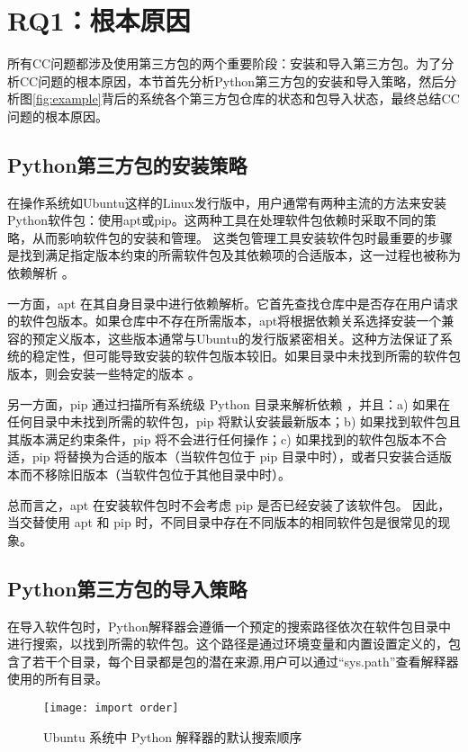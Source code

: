 \section{RQ1：根本原因}
所有CC问题都涉及使用第三方包的两个重要阶段：安装和导入第三方包。为了分析CC问题的根本原因，本节首先分析Python第三方包的安装和导入策略，然后分析图\ref{fig:example}背后的系统各个第三方包仓库的状态和包导入状态，最终总结CC问题的根本原因。

\subsection{Python第三方包的安装策略}
在操作系统如Ubuntu这样的Linux发行版中，用户通常有两种主流的方法来安装Python软件包：使用apt或pip。这两种工具在处理软件包依赖时采取不同的策略，从而影响软件包的安装和管理。
这类包管理工具安装软件包时最重要的步骤是找到满足指定版本约束的所需软件包及其依赖项的合适版本，这一过程也被称为依赖解析 。

一方面，apt 在其自身目录中进行依赖解析。它首先查找仓库中是否存在用户请求的软件包版本。如果仓库中不存在所需版本，apt将根据依赖关系选择安装一个兼容的预定义版本，这些版本通常与Ubuntu的发行版紧密相关。这种方法保证了系统的稳定性，但可能导致安装的软件包版本较旧。如果目录中未找到所需的软件包版本，则会安装一些特定的版本 。

另一方面，pip 通过扫描所有系统级 Python 目录来解析依赖 ，并且：a) 如果在任何目录中未找到所需的软件包，pip 将默认安装最新版本；b) 如果找到软件包且其版本满足约束条件，pip 将不会进行任何操作；c) 如果找到的软件包版本不合适，pip 将替换为合适的版本（当软件包位于 pip 目录中时），或者只安装合适版本而不移除旧版本（当软件包位于其他目录中时）。

总而言之，apt 在安装软件包时不会考虑 pip 是否已经安装了该软件包。
因此，当交替使用 apt 和 pip 时，不同目录中存在不同版本的相同软件包是很常见的现象。

\subsection{Python第三方包的导入策略}\label{3.2.2}
在导入软件包时，Python解释器会遵循一个预定的搜索路径依次在软件包目录中进行搜索，以找到所需的软件包。这个路径是通过环境变量和内置设置定义的，包含了若干个目录，每个目录都是包的潜在来源,用户可以通过“sys.path”查看解释器使用的所有目录。
\begin{figure}[t] %
	\centering
	\texttt{[image: import order]}
	\caption{Ubuntu 系统中 Python 解释器的默认搜索顺序}
	\label{fig:order}
\end{figure}

